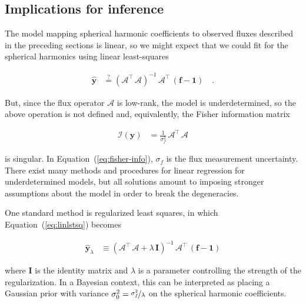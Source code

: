 \documentclass[modern,linenumbers]{aastex62}
\begin{document}
\subsection{Implications for inference}
%
The model mapping spherical harmonic coefficients to observed fluxes described
in the preceding sections is linear, so we might expect that we could fit
for the spherical harmonics using linear least-squares
%
\begin{linenomath}\begin{align}
        \label{eq:linlstsq}
        \hat{\mathbf{y}} & \stackrel{?}{=}
        \left(\pmb{\mathcal{A}}^\top\,\pmb{\mathcal{A}}\right)^{-1}\,\pmb{\mathcal{A}}^\top\,\left(\mathbf{f} - \mathbf{1}\right)
        \quad.
    \end{align}\end{linenomath}
%
But, since the flux operator $\pmb{\mathcal{A}}$ is low-rank, the model is
underdetermined, so the above operation is not defined and, equivalently,
the Fisher information matrix
%
\begin{linenomath}\begin{align}
        \label{eq:fisher-info}
        \pmb{\mathcal{I}}(\mathbf{y}) & = \frac{1}{\sigma_f^2} \, \pmb{\mathcal{A}}^\top\,\pmb{\mathcal{A}}
    \end{align}\end{linenomath}
%
is singular.
In Equation~(\ref{eq:fisher-info}), $\sigma_f$ is the flux measurement uncertainty.
There exist many methods and procedures for linear regression for underdetermined
models, but all solutions amount to imposing stronger assumptions about the
model in order to break the degeneracies.

One standard method is regularized least squares, in which
Equation~(\ref{eq:linlstsq}) becomes
%
\begin{linenomath}\begin{align}
        \hat{\mathbf{y}}_\lambda & \equiv
        \left(\pmb{\mathcal{A}}^\top\,\pmb{\mathcal{A}} + \lambda\,\mathbf{I}\right)^{-1}\,\pmb{\mathcal{A}}^\top\,\left(\mathbf{f} - \mathbf{1}\right)
    \end{align}\end{linenomath}
%
where $\mathbf{I}$ is the identity matrix and $\lambda$ is a parameter
controlling the strength of the regularization.
In a Bayesian context, this can be interpreted as placing a Gaussian prior
with variance $\sigma_0^{2} = \nicefrac{\sigma_f^2}{\lambda}$ on the spherical harmonic coefficients.
\end{document}
